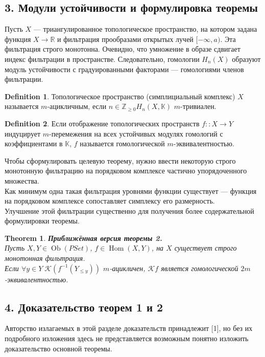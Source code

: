 \documentclass[a4paper, 12pt]{article}
\newtheorem{theorem}{Theorem}
\theoremstyle{definition}
\newtheorem{definition}{Definition}
\theoremstyle{remark}
\begin{document}
\subsection*{3. Модули устойчивости и формулировка теоремы}
Пусть $X$ --- триангулированное топологическое пространство, на котором задана функция $X \to \mathbb{R}$ и фильтрация прообразами открытых лучей $[-\infty,a)$. Эта фильтрация строго монотонна. Очевидно, что умножение в образе сдвигает индекс фильтрации в пространстве. Следовательно, гомологии $H_n(X)$ образуют модуль устойчивости с градуированными факторами --- гомологиями членов фильтрации.
\begin{definition}
  Топологическое пространство (симплициальный комплекс) $X$ называется $m$-ацикличным, если $n \in \mathbb{Z}_{\geq 0} H_n(X,\mathbb{K})$ $m$-тривиален.
\end{definition}
\begin{definition}
  Если отображение топологических пространств $f :: X \to Y$ индуцирует $m$-перемежения на всех устойчивых модулях гомологий с коэффициентами в $\mathbb{K}$, $f$ называется гомологической $m$-эквивалентностью.
\end{definition}
Чтобы сформулировать целевую теорему, нужно ввести некоторую строго монотонную фильтрацию на порядковом комплексе частично упорядоченного множества.\\
Как минимум одна такая фильтрация уровнями функции существует --- функция на порядковом комплексе сопоставляет симплексу его размерность.\\
Улучшение этой фильтрации существенно для получения более содержательной формулировки теоремы.
\begin{theorem}
  \textbf{Приближённая версия теоремы 2.}\\
  Пусть $X, Y \in \operatorname{Ob}(PSet)$, $f \in \operatorname{Hom}(X,Y)$, на $X$ существует строго монотонная фильтрация.\\
  Если $\forall y \in Y\;\mathcal{K}(f^{-1}(Y_{\leqslant y}))$ $m$-ацикличен, $\mathcal{K}f$ является гомологической $2m$-эквивалентностью.\\
\end{theorem}

\subsection*{4. Доказательство теорем 1 и 2}

Авторство излагаемых в этой разделе доказательств принадлежит [1], но без их подробного изложения здесь не представляется возможным понятно изложить доказательство основной теоремы.\\
\end{document}
